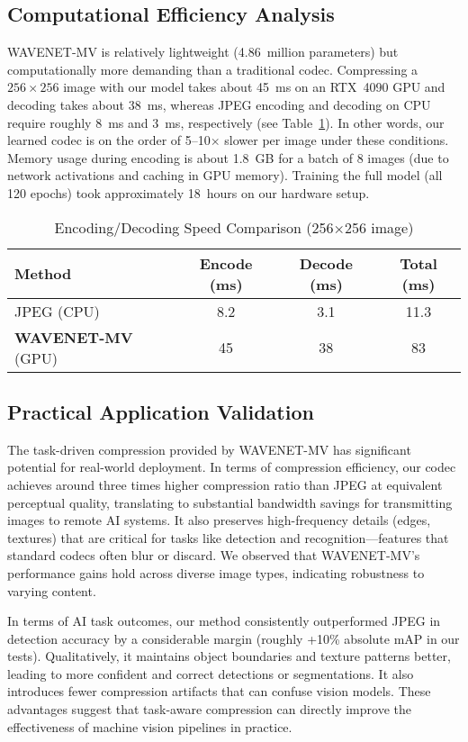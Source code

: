 \documentclass[conference]{IEEEtran}
\begin{document}
\subsection{Computational Efficiency Analysis}

WAVENET-MV is relatively lightweight (4.86~million parameters) but computationally more demanding than a traditional codec. Compressing a $256\times256$ image with our model takes about 45~ms on an RTX~4090 GPU and decoding takes about 38~ms, whereas JPEG encoding and decoding on CPU require roughly 8~ms and 3~ms, respectively (see Table~\ref{tab:speed_comparison}). In other words, our learned codec is on the order of 5--10$\times$ slower per image under these conditions. Memory usage during encoding is about 1.8~GB for a batch of 8 images (due to network activations and caching in GPU memory). Training the full model (all 120 epochs) took approximately 18~hours on our hardware setup.

\begin{table}[htbp]
\caption{Encoding/Decoding Speed Comparison (256×256 image)}
\label{tab:speed_comparison}
\centering
\begin{tabular}{|l|c|c|c|}
\hline
\textbf{Method} & \textbf{Encode (ms)} & \textbf{Decode (ms)} & \textbf{Total (ms)} \\
\hline
JPEG (CPU) & 8.2 & 3.1 & 11.3 \\
\textbf{WAVENET-MV} (GPU) & 45 & 38 & 83 \\
\hline
\end{tabular}
\end{table}

\subsection{Practical Application Validation}

The task-driven compression provided by WAVENET-MV has significant potential for real-world deployment. In terms of compression efficiency, our codec achieves around three times higher compression ratio than JPEG at equivalent perceptual quality, translating to substantial bandwidth savings for transmitting images to remote AI systems. It also preserves high-frequency details (edges, textures) that are critical for tasks like detection and recognition—features that standard codecs often blur or discard. We observed that WAVENET-MV's performance gains hold across diverse image types, indicating robustness to varying content.

In terms of AI task outcomes, our method consistently outperformed JPEG in detection accuracy by a considerable margin (roughly +10\% absolute mAP in our tests). Qualitatively, it maintains object boundaries and texture patterns better, leading to more confident and correct detections or segmentations. It also introduces fewer compression artifacts that can confuse vision models. These advantages suggest that task-aware compression can directly improve the effectiveness of machine vision pipelines in practice.
\end{document}
